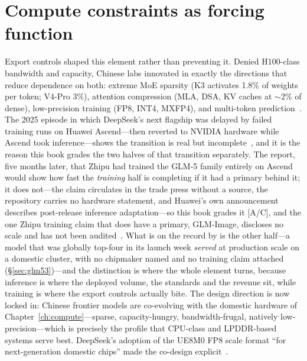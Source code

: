 \section{Compute constraints as forcing function}

Export controls shaped this element rather than preventing it. Denied H100-class bandwidth and capacity, Chinese labs innovated in exactly the directions that reduce dependence on both: extreme MoE sparsity (K3 activates 1.8\% of weights per token; V4-Pro 3\%), attention compression (MLA, DSA, KV caches at $\sim$2\% of dense), low-precision training (FP8, INT4, MXFP4), and multi-token prediction~\cite{raschka,kimi-k3}. The 2025 episode in which DeepSeek's next flagship was delayed by failed training runs on Huawei Ascend---then reverted to NVIDIA hardware while Ascend took inference---shows the transition is real but incomplete~\cite{ascend-delay}, and it is the reason this book grades the two halves of that transition separately. The report, five months later, that Zhipu had trained the GLM-5 family entirely on Ascend would show how fast the \emph{training} half is completing if it had a primary behind it; it does not---the claim circulates in the trade press without a source, the repository carries no hardware statement, and Huawei's own announcement describes post-release inference adaptation---so this book grades it [A/C], and the one Zhipu training claim that does have a primary, GLM-Image, discloses no scale and has not been audited~\cite{glm5,glm5-ascend-unsourced,zhipu-ascend-prior}. What is on the record by \datafreeze is the other half---a model that was globally top-four in its launch week \emph{served} at production scale on a domestic cluster, with no chipmaker named and no training claim attached (\S\ref{sec:glm53})---and the distinction is where the whole element turns, because inference is where the deployed volume, the standards and the revenue sit, while training is where the export controls actually bite. The design direction is now locked in: Chinese frontier models are co-evolving with the domestic hardware of Chapter~\ref{ch:compute}---sparse, capacity-hungry, bandwidth-frugal, natively low-precision---which is precisely the profile that CPU-class and LPDDR-based systems serve best. DeepSeek's adoption of the UE8M0 FP8 scale format ``for next-generation domestic chips'' made the co-design explicit~\cite{ue8m0}.

